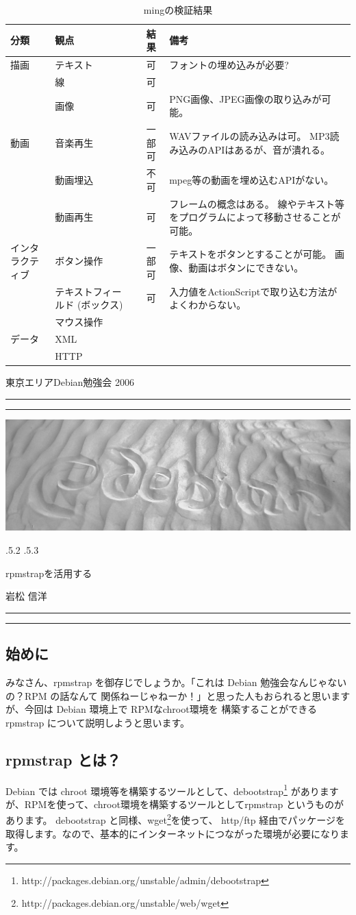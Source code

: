 \documentclass[mingoth,a4paper]{jsarticle}
\makeatletter
\renewcommand{\section}{\@startsection{section}{1}{\z@}%
    {\Cvs \@plus.5\Cdp \@minus.2\Cdp}%
    {.5\Cvs \@plus.3\Cdp}%
    {\normalfont\Huge\headfont\raggedright\centering}} %
\newcommand{\dancersection}[2]{%
\newpage
東京エリアDebian勉強会 2006
\hrule
\vspace{0.5mm}
\hrule
\hfill{}\includegraphics[width=16cm]{image2006-natsu/guruguru-sand-light.png}\\
\vspace{-5cm}
\begin{center}
\section{#1}
\end{center}
\hfill{}\colorbox{white}{#2}\hspace{3cm}\space\\
\vspace{1cm}
\hrule
\vspace{0.5mm}
\hrule
\vspace{1cm}
}
\makeatother
\begin{document}
\begin{table}[h]
\begin{center}
\caption{mingの検証結果}
\begin{tabular}{|l|p{7em}|p{3em}|c|p{10em}|}
\hline
分類 & 観点 && 結果 & 備考 \\
\hline
\hline
描画 & テキスト && 可 & フォントの埋め込みが必要? \\
\cline{2-5}
     & 線 && 可 & \\
\cline{2-5}
     & 画像 && 可 & PNG画像、JPEG画像の取り込みが可能。 \\
\hline
動画 & 音楽再生 && 一部可 & WAVファイルの読み込みは可。
                  MP3読み込みのAPIはあるが、音が潰れる。 \\
\cline{2-5}
     & 動画埋込 && 不可 & mpeg等の動画を埋め込むAPIがない。 \\
\cline{2-5}
     & 動画再生 && 可 & フレームの概念はある。
                       線やテキスト等をプログラムによって移動させることが可能。 \\
\hline
インタラクティブ & ボタン操作 && 一部可 & テキストをボタンとすることが可能。
                                       画像、動画はボタンにできない。 \\
\cline{2-5}
     & テキストフィールド (ボックス) && 可 & 入力値をActionScriptで取り込む方法がよくわからない。 \\
\cline{2-5}
     & マウス操作 && & \\
\hline
データ & XML && & \\
\cline{2-5}
      & HTTP && & \\
\hline
\end{tabular}
\end{center}
\end{table}

\clearpage

\dancersection{rpmstrapを活用する}{岩松 信洋}
\label{sec:iwamatsurpmstrap}

\subsection{始めに}
みなさん、rpmstrap を御存じでしょうか。「これは Debian 勉強会なんじゃないの？RPM の話なんて
関係ねーじゃねーか！」と思った人もおられると思いますが、今回は Debian 環境上で RPMなchroot環境を
構築することができるrpmstrap について説明しようと思います。

\subsection{rpmstrap とは？}
Debian では chroot 環境等を構築するツールとして、debootstrap\footnote{http://packages.debian.org/unstable/admin/debootstrap}
がありますが、RPMを使って、chroot環境を構築するツールとしてrpmstrap というものがあります。
debootstrap と同様、wget\footnote{http://packages.debian.org/unstable/web/wget}を使って、
http/ftp 経由でパッケージを取得します。なので、基本的にインターネットにつながった環境が必要になります。
\end{document}
